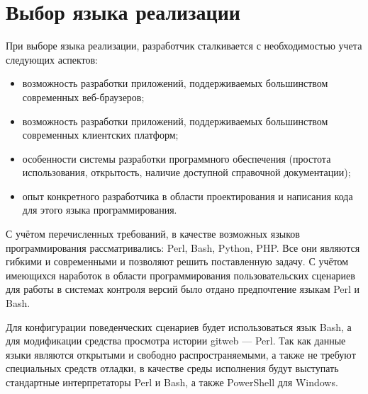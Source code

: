 \section{Выбор языка реализации} \label{technologic_langiage}


При выборе языка реализации, разработчик сталкивается с необходимостью учета следующих аспектов:
\begin{itemize}
	\item возможность разработки приложений, поддерживаемых большинством современных веб-браузеров;
	\item возможность разработки приложений, поддерживаемых большинством современных клиентских платформ;
	\item особенности системы разработки программного обеспечения (простота использования, открытость, наличие доступной справочной документации);
	\item опыт конкретного разработчика в области проектирования и написания кода для этого языка программирования.
\end{itemize}

С учётом перечисленных требований, в качестве возможных языков программирования рассматривались: Perl, Bash, Python, PHP. Все они являются гибкими и современными и позволяют решить поставленную задачу. С учётом имеющихся наработок в области программирования пользовательских сценариев для работы в системах контроля версий было отдано предпочтение языкам Perl и Bash.

\vspace{\baselineskip}
Для конфигурации поведенческих сценариев будет использоваться язык Bash, а для модификации средства просмотра истории gitweb --- Perl. Так как данные языки являются открытыми и свободно распространяемыми, а также не требуют специальных средств отладки, в качестве среды исполнения будут выступать стандартные интерпретаторы Perl и Bash, а также PowerShell для Windows.